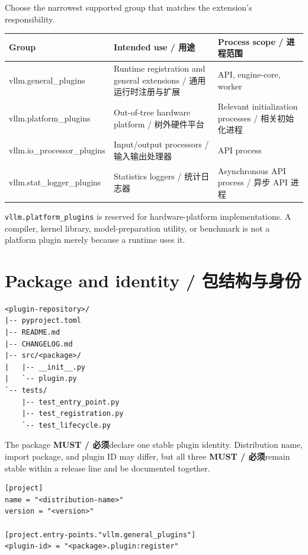 \documentclass[11pt,a4paper,fontset=none]{ctexart}
\newcommand{\must}{\textbf{MUST / 必须}}
\begin{document}
Choose the narrowest supported group that matches the extension's responsibility.

\begin{longtable}{>{\small\ttfamily\raggedright\arraybackslash}p{}>{\raggedright\arraybackslash}p{}>{\raggedright\arraybackslash}p{}}
\toprule
\normalfont\bfseries Group & \bfseries Intended use / 用途 & \bfseries Process scope / 进程范围 \\
\midrule
\endhead
vllm.general\_plugins & Runtime registration and general extensions / 通用运行时注册与扩展 & API, engine-core, worker \\
vllm.platform\_plugins & Out-of-tree hardware platform / 树外硬件平台 & Relevant initialization processes / 相关初始化进程 \\
vllm.io\_processor\_plugins & Input/output processors / 输入输出处理器 & API process \\
vllm.stat\_logger\_plugins & Statistics loggers / 统计日志器 & Asynchronous API process / 异步 API 进程 \\
\bottomrule
\end{longtable}

\texttt{vllm.platform\_plugins} is reserved for hardware-platform implementations. A compiler,
kernel library, model-preparation utility, or benchmark is not a platform plugin merely because a
runtime uses it.

\section{Package and identity / 包结构与身份}

\begin{lstlisting}
<plugin-repository>/
|-- pyproject.toml
|-- README.md
|-- CHANGELOG.md
|-- src/<package>/
|   |-- __init__.py
|   `-- plugin.py
`-- tests/
    |-- test_entry_point.py
    |-- test_registration.py
    `-- test_lifecycle.py
\end{lstlisting}

The package \must declare one stable plugin identity. Distribution name, import package, and plugin
ID may differ, but all three \must remain stable within a release line and be documented together.

\begin{lstlisting}
[project]
name = "<distribution-name>"
version = "<version>"

[project.entry-points."vllm.general_plugins"]
<plugin-id> = "<package>.plugin:register"
\end{lstlisting}
\end{document}
